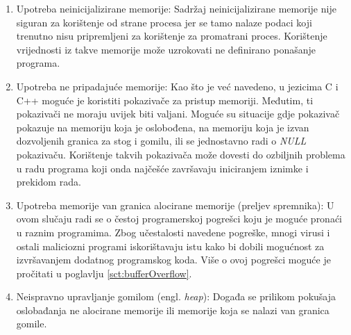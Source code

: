\documentclass[times, utf8, diplomski, numeric]{fer}
\begin{document}
\begin{enumerate}

\item Upotreba neinicijalizirane memorije: Sadržaj neinicijalizirane
memorije nije siguran za korištenje od strane procesa jer se tamo 
nalaze podaci koji trenutno nisu pripremljeni za korištenje za 
promatrani proces. Korištenje					%
vrijednosti iz takve memorije može uzrokovati ne definirano
ponašanje programa.

\item Upotreba ne pripadajuće memorije: Kao što je već navedeno,
u jezicima C i C++ moguće je koristiti pokazivače za pristup
memoriji. Međutim, ti pokazivači ne moraju uvijek biti valjani.
Moguće su situacije gdje pokazivač pokazuje na memoriju koja je
oslobođena, na memoriju koja je izvan dozvoljenih granica za stog
i gomilu, ili se jednostavno radi o \emph{NULL} pokazivaču.
Korištenje takvih pokazivača može dovesti do ozbiljnih problema u
radu programa koji onda najčešće završavaju iniciranjem iznimke i
prekidom rada.

\item Upotreba memorije van granica alocirane memorije (preljev
spremnika): U ovom slučaju radi se o čestoj			%
programerskoj pogrešci koju je moguće pronaći u raznim
programima. Zbog učestalosti navedene pogreške, mnogi virusi i
ostali maliciozni programi iskorištavaju istu kako bi dobili
mogućnost za izvršavanjem dodatnog programskog koda. Više o ovoj pogrešci
moguće je pročitati u poglavlju \ref{sct:bufferOverflow}.

\item Neispravno upravljanje gomilom (engl. \emph{heap}): Događa				%
se prilikom pokušaja oslobađanja ne alocirane memorije ili
memorije koja se nalazi van granica gomile. 

\end{enumerate}
\end{document}
